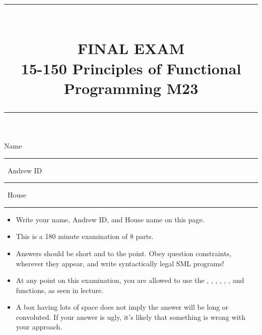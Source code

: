 \documentclass[addpoints,12pt]{exam}
\newcommand{\HRule}[1]{\rule{\linewidth}{#1}}
\begin{document}
\pagestyle{headandfoot}
\footer{}{\thepage}{}


\setlength{\droptitle}{-8em}   %

\title{ \normalsize \textsc{}
		\HRule{1.5pt} \\
		\large \textbf{
      \uppercase{Final Exam} \\
      15-150 Principles of Functional Programming M23} \\
    \HRule{1.5pt}
}
\date{}

\maketitle

\vspace{-3cm}

\hspace{-1cm} Name \rule{5cm}{0.4pt} \, Andrew ID \rule{3cm}{0.4pt} \, House \rule{3.5cm}{0.4pt}

\vspace{5pt}

\begin{itemize}
  \item Write your name, Andrew ID, and House name on this page.
  \vspace{-5pt}
  \item This is a 180 minute examination of 8 parts.
  \vspace{-5pt}
  \item Answers should be short and to the point. Obey question constraints, wherever
  they appear, and write syntactically legal SML programs!
  \vspace{-5pt}
  \item At any point on this examination, you are allowed to use the ,
  , , , , , and  functions,
  as seen in lecture.
  \vspace{-5pt}
  \item A box having lots of space does not imply the answer will be long or convoluted. If your
  answer is ugly, it's likely that something is wrong with your approach.
\end{itemize}
\vspace{\fill}
\end{document}
